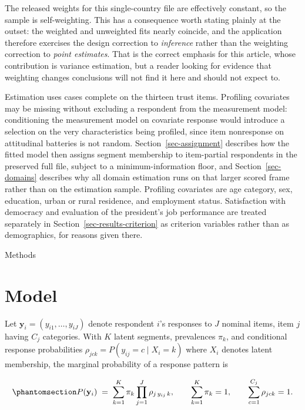 \documentclass[
  12pt]{article}
\begin{document}
The released weights for this single-country file are effectively
constant, so the sample is self-weighting. This has a consequence worth
stating plainly at the outset: the weighted and unweighted fits nearly
coincide, and the application therefore exercises the design correction
to \emph{inference} rather than the weighting correction to \emph{point
estimates}. That is the correct emphasis for this article, whose
contribution is variance estimation, but a reader looking for evidence
that weighting changes conclusions will not find it here and should not
expect to.

Estimation uses cases complete on the thirteen trust items. Profiling
covariates may be missing without excluding a respondent from the
measurement model: conditioning the measurement model on covariate
response would introduce a selection on the very characteristics being
profiled, since item nonresponse on attitudinal batteries is not random.
Section~\ref{sec-assignment} describes how the fitted model then assigns
segment membership to item-partial respondents in the preserved full
file, subject to a minimum-information floor, and
Section~\ref{sec-domains} describes why all domain estimation runs on
that larger scored frame rather than on the estimation sample. Profiling
covariates are age category, sex, education, urban or rural residence,
and employment status. Satisfaction with democracy and evaluation of the
president's job performance are treated separately in
Section~\ref{sec-results-criterion} as criterion variables rather than
as demographics, for reasons given there.

Methods

\section{Model}\label{sec-model}

Let \(\mathbf{y}_i = (y_{i1}, \dots, y_{iJ})\) denote respondent \(i\)'s
responses to \(J\) nominal items, item \(j\) having \(C_j\) categories.
With \(K\) latent segments, prevalences \(\pi_k\), and conditional
response probabilities \(\rho_{jck} = P(y_{ij} = c \mid X_i = k)\) where
\(X_i\) denotes latent membership, the marginal probability of a
response pattern is

\begin{equation}\phantomsection\label{eq-lca}{
P(\mathbf{y}_i) \;=\; \sum_{k=1}^{K} \pi_k \prod_{j=1}^{J} \rho_{j\,y_{ij}\,k},
\qquad \sum_{k=1}^{K}\pi_k = 1, \qquad \sum_{c=1}^{C_j} \rho_{jck} = 1 .
}\end{equation}
\end{document}
